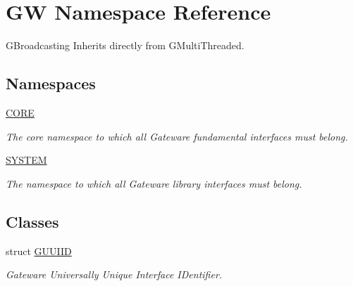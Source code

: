 \hypertarget{namespaceGW}{}\section{GW Namespace Reference}
\label{namespaceGW}


G\+Broadcasting Inherits directly from G\+Multi\+Threaded.  


\subsection*{Namespaces}
\begin{DoxyCompactItemize}
\item 
 \hyperlink{namespaceGW_1_1CORE}{C\+O\+RE}
\begin{DoxyCompactList}\small\item\em The core namespace to which all Gateware fundamental interfaces must belong. \end{DoxyCompactList}\item 
 \hyperlink{namespaceGW_1_1SYSTEM}{S\+Y\+S\+T\+EM}
\begin{DoxyCompactList}\small\item\em The namespace to which all Gateware library interfaces must belong. \end{DoxyCompactList}\end{DoxyCompactItemize}
\subsection*{Classes}
\begin{DoxyCompactItemize}
\item 
struct \hyperlink{structGW_1_1GUUIID}{G\+U\+U\+I\+ID}
\begin{DoxyCompactList}\small\item\em Gateware Universally Unique Interface I\+Dentifier. \end{DoxyCompactList}\end{DoxyCompactItemize}
